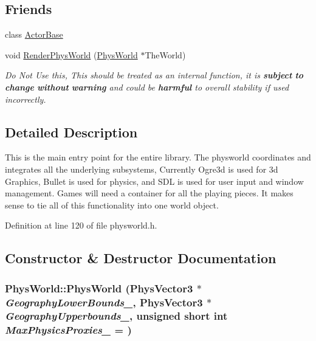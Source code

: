 \subsection*{Friends}
\begin{DoxyCompactItemize}
\item 
\hypertarget{classPhysWorld_ac09063d4b0192680ba3aa0bd4003a274}{
class \hyperlink{classPhysWorld_ac09063d4b0192680ba3aa0bd4003a274}{ActorBase}}
\label{db/df5/classPhysWorld_ac09063d4b0192680ba3aa0bd4003a274}

\item 
void \hyperlink{classPhysWorld_a54ca2a75bbccb9b2129f434874f1e693}{RenderPhysWorld} (\hyperlink{classPhysWorld}{PhysWorld} $\ast$TheWorld)
\begin{DoxyCompactList}\small\item\em Do Not Use this, This should be treated as an internal function, it is {\bfseries subject} {\bfseries to} {\bfseries change} {\bfseries without} {\bfseries warning} and could be {\bfseries harmful} to overall stability if used incorrectly. \item\end{DoxyCompactList}\end{DoxyCompactItemize}


\subsection{Detailed Description}
This is the main entry point for the entire library. The physworld coordinates and integrates all the underlying subsystems, Currently Ogre3d is used for 3d Graphics, Bullet is used for physics, and SDL is used for user input and window management. Games will need a container for all the playing pieces. It makes sense to tie all of this functionality into one world object. 

Definition at line 120 of file physworld.h.

\subsection{Constructor \& Destructor Documentation}
\hypertarget{classPhysWorld_a3228c98369082139722d3c918d735e6c}{
\subsubsection[{PhysWorld}]{\setlength{\rightskip}{0pt plus 5cm}PhysWorld::PhysWorld ({\bf PhysVector3} $\ast$ {\em GeographyLowerBounds\_\-}, \/  {\bf PhysVector3} $\ast$ {\em GeographyUpperbounds\_\-}, \/  unsigned short int {\em MaxPhysicsProxies\_\-} = {})}}
\label{db/df5/classPhysWorld_a3228c98369082139722d3c918d735e6c}



